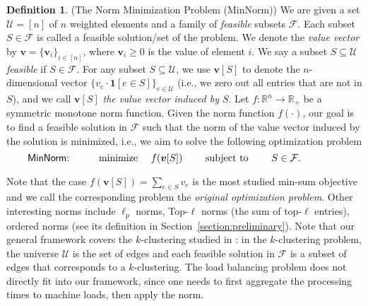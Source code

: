 \documentclass[11pt,a4paper]{article} \usepackage{enumitem}
\newcommand{\assigned}[1]{[ #1 ]}
\newcommand{\calF}{\mathcal{F}}
\newcommand{\calU}{\mathcal{U}}
\newcommand{\boldv}{\boldsymbol{v}}
\newcommand{\bbone}{\mathbf{1}}
\newcommand{\norm}{f}
\newcommand{\minnorm}{\textsf{MinNorm}}
\newcommand{\topdash}[1]{\mbox{Top-$#1$}}
\newcommand{\R}{\mathbb{R}}
\newcommand{\Rpos}{\mathbb{R}_+}
\theoremstyle{definition}
\newtheorem{definition}{Definition}[section]
\begin{document}
\begin{definition} (The Norm Minimization Problem (\minnorm))
We are given a set $\calU=[n]$ of $n$ weighted elements
and a family of {\em feasible} subsets $\calF$.
Each subset $S\in \calF$ is called a feasible solution/set of the problem.
We denote the {\em value vector} by $\boldv =\{\boldv_i\}_{i\in [n]}$,
where $\boldv_i\geq 0$ is the value of element $i$.
We say a subset $S\subseteq \calU$ {\em feasible} if
$S\in \calF$.
For any subset $S\subseteq \calU$, we use  
$\boldv[S]$ to denote the $n$-dimensional vector 
$\{v_e\cdot \bbone[e\in S]\}_{e\in \calU}$ (i.e., we zero out
all entries that are not in $S$), and we call $\boldv[S]$
{\em the value vector induced by $S$}.
Let $\norm: \R^n\rightarrow\Rpos$ be a symmetric monotone norm function.
Given the norm function $\norm(\cdot)$, our goal is to find a feasible solution in $\calF$ such that the norm of the value vector induced by the solution is minimized, i.e., we aim to solve the following optimization problem
$$
\text{\minnorm:}\quad\qquad
\text{minimize } \quad f(\boldv\assigned{S})  \quad \quad 
\text{ subject to } \quad \quad  S\in \calF. \qquad\qquad
$$
\end{definition}

Note that the case $f(\boldv\assigned{S})= \sum_{e\in S} v_e$ is the most studied min-sum objective and we call the corresponding problem the {\em original optimization problem}. Other interesting norms include $\ell_p$ norms, \topdash{\ell} norms (the sum of top-$\ell$ entries), ordered norms (see its definition in Section~\ref{section:preliminary}).
Note that our general framework covers the $k$-clustering studied in \cite{chakrabarty2019approximation}:
in the $k$-clustering problem, the universe $\calU$
is the set of edges and each feasible solution in $\calF$ is a subset of edges that corresponds to a $k$-clustering.
The load balancing problem does not directly fit into our framework, since
one needs to first aggregate the processing times to machine loads, then apply the norm.
\end{document}
